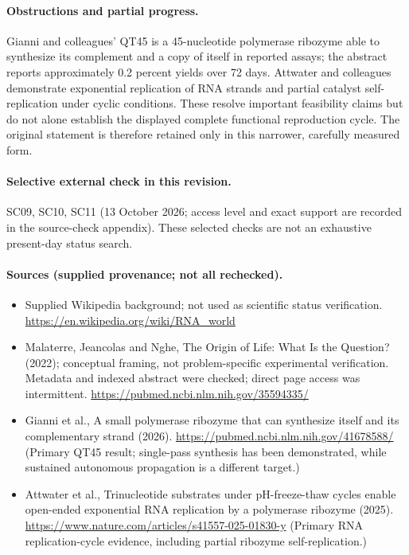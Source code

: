 \documentclass[11pt]{article}
\begin{document}
\paragraph{Obstructions and partial progress.} Gianni and colleagues' QT45 is a 45-nucleotide polymerase ribozyme able to synthesize its complement and a copy of itself in reported assays; the abstract reports approximately 0.2 percent yields over 72 days. Attwater and colleagues demonstrate exponential replication of RNA strands and partial catalyst self-replication under cyclic conditions. These resolve important feasibility claims but do not alone establish the displayed complete functional reproduction cycle. The original statement is therefore retained only in this narrower, carefully measured form.

\paragraph{Selective external check in this revision.} SC09, SC10, SC11 (13 October 2026; access level and exact support are recorded in the source-check appendix). These selected checks are not an exhaustive present-day status search.

\paragraph{Sources (supplied provenance; not all rechecked).} \begin{itemize}
\item Supplied Wikipedia background; not used as scientific status verification. \url{https://en.wikipedia.org/wiki/RNA_world}
\item Malaterre, Jeancolas and Nghe, The Origin of Life: What Is the Question? (2022); conceptual framing, not problem-specific experimental verification. Metadata and indexed abstract were checked; direct page access was intermittent. \url{https://pubmed.ncbi.nlm.nih.gov/35594335/}
\item Gianni et al., A small polymerase ribozyme that can synthesize itself and its complementary strand (2026). \url{https://pubmed.ncbi.nlm.nih.gov/41678588/} (Primary QT45 result; single-pass synthesis has been demonstrated, while sustained autonomous propagation is a different target.)
\item Attwater et al., Trinucleotide substrates under pH-freeze-thaw cycles enable open-ended exponential RNA replication by a polymerase ribozyme (2025). \url{https://www.nature.com/articles/s41557-025-01830-y} (Primary RNA replication-cycle evidence, including partial ribozyme self-replication.)
\end{itemize}
\end{document}
